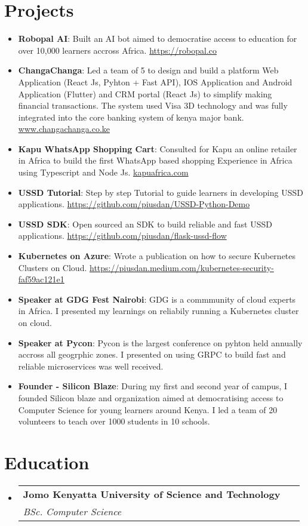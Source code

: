\documentclass[letterpaper,11pt]{article}
\makeatletter
\newcommand{\resumeItem}[2]{
  \item\small{
    \textbf{#1}{: #2 \vspace{-2pt}}
  }
}
\newcommand{\resumeSubheading}[4]{
  \vspace{-1pt}\item
    \begin{tabular*}{0.97\textwidth}{l@{\extracolsep{\fill}}r}
      \textbf{#1} & #2 \\
      \textit{\small#3} & \textit{\small #4} \\
    \end{tabular*}\vspace{-5pt}
}
\newcommand{\resumeSubItem}[2]{\resumeItem{#1}{#2}\vspace{-4pt}}
\newcommand{\resumeSubHeadingListStart}{\begin{itemize}[leftmargin=*]}
\newcommand{\resumeSubHeadingListEnd}{\end{itemize}}
\makeatother
\begin{document}
\section{Projects}
  \resumeSubHeadingListStart  	
	  \resumeSubItem {Robopal AI}
	  {Built an AI bot aimed to democratise access to education for over 10,000 learners accross Africa. \href{https://robopal.co}{https://robopal.co}}
	\resumeSubItem {ChangaChanga}
	{Led a team of 5 to design and build a platform Web Application (React Js, Pyhton + Fast API), IOS Application and Android Application (Flutter) and CRM portal (React Js) to simplify making financial transactions. The system used Visa 3D technology and was fully integrated into the core banking system of kenya major bank. \href{https://changachanga.co.ke}{www.changachanga.co.ke}}
\resumeSubItem{Kapu WhatsApp Shopping Cart}
{Consulted for Kapu an online retailer in Africa to build the first WhatsApp based shopping Experience in Africa using Typescript and Node Js. \href{https://kapuafrica.com}{kapuafrica.com}}
    \resumeSubItem{USSD Tutorial}
      {Step by step Tutorial to guide learners in developing USSD applications. \href{https://github.com/piusdan/USSD-Python-Demo}{https://github.com/piusdan/USSD-Python-Demo}}
    \resumeSubItem{USSD SDK}
      {Open sourced an SDK to build reliable and fast USSD applications. \href{https://github.com/piusdan/flask-ussd-flow}{https://github.com/piusdan/flask-ussd-flow}}
    \resumeSubItem{Kubernetes on Azure}
      {Wrote a publication on how to secure Kubernetes Clusters on Cloud. \href{https://piusdan.medium.com/kubernetes-security-faf59ac121e1}{https://piusdan.medium.com/kubernetes-security-faf59ac121e1}}
  	\resumeSubItem{Speaker at GDG Fest Nairobi}
      {GDG is a commmunity of cloud experts in Africa. I presented my learnings on reliabily running a Kubernetes cluster on cloud.}
  	\resumeSubItem{Speaker at Pycon}
      {Pycon is the largest conference on pyhton held annually accross all geogrphic zones. I presented on using GRPC to build fast and reliable microservices was well received.}
    \resumeSubItem{Founder - Silicon Blaze}
      {During my first and second year of campus, I founded Silicon blaze and organization aimed at democratising access to Computer Science for young learners around Kenya. I led a team of 20 volunteers to teach over 1000 students in 10 schools.}
  \resumeSubHeadingListEnd

\section{Education}
  \resumeSubHeadingListStart
    \resumeSubheading
      {Jomo Kenyatta University of Science and Technology}{}
      {BSc. Computer Science}\
  \resumeSubHeadingListEnd

\end{document}
